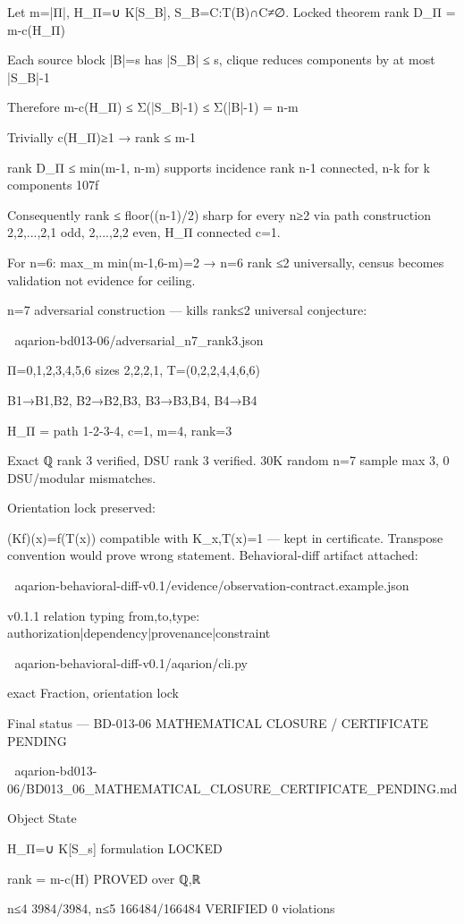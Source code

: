 Let m=|Π|, H_Π=∪ K[S_B], S_B={C:T(B)∩C≠∅}. Locked theorem rank D_Π = m-c(H_Π)


Each source block |B|=s has |S_B| ≤ s, clique reduces components by at most |S_B|-1


Therefore m-c(H_Π) ≤ Σ(|S_B|-1) ≤ Σ(|B|-1) = n-m


Trivially c(H_Π)≥1 → rank ≤ m-1


rank D_Π ≤ min(m-1, n-m) supports incidence rank n-1 connected, n-k for k components 107f


Consequently rank ≤ floor((n-1)/2) sharp for every n≥2 via path construction 2,2,...,2,1 odd, 2,...,2,2 even, H_Π connected c=1.


For n=6: max_m min(m-1,6-m)=2 → n=6 rank ≤2 universally, census becomes validation not evidence for ceiling.


n=7 adversarial construction — kills rank≤2 universal conjecture:


📎 aqarion-bd013-06/adversarial_n7_rank3.json

Π={{0,1},{2,3},{4,5},{6}} sizes 2,2,2,1, T=(0,2,2,4,4,6,6)


B1→{B1,B2}, B2→{B2,B3}, B3→{B3,B4}, B4→{B4}


H_Π = path 1-2-3-4, c=1, m=4, rank=3


Exact ℚ rank 3 verified, DSU rank 3 verified. 30K random n=7 sample max 3, 0 DSU/modular mismatches.


Orientation lock preserved:


(Kf)(x)=f(T(x)) compatible with K_{x,T(x)}=1 — kept in certificate. Transpose convention would prove wrong statement. Behavioral-diff artifact attached:


📎 aqarion-behavioral-diff-v0.1/evidence/observation-contract.example.json

v0.1.1 relation typing from,to,type: authorization|dependency|provenance|constraint


📎 aqarion-behavioral-diff-v0.1/aqarion/cli.py

exact Fraction, orientation lock


Final status — BD-013-06 MATHEMATICAL CLOSURE / CERTIFICATE PENDING


📎 aqarion-bd013-06/BD013_06_MATHEMATICAL_CLOSURE_CERTIFICATE_PENDING.md


Object	State


H_Π=∪ K[S_s] formulation	LOCKED

rank = m-c(H)	PROVED over ℚ,ℝ

n≤4 3984/3984, n≤5 166484/166484	VERIFIED 0 violations

